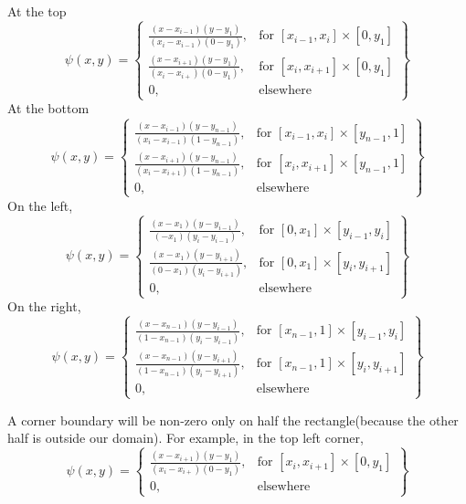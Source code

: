 \documentclass[letterpaper,12pt]{article}
\begin{document}
\begin{enumerate}
 At the top
   \[
    \psi(x, y) = \left\{\begin{array}{lr}
       \frac{(x-x_{i-1})(y-y_1)}{(x_i-x_{i-1})(0-y_1)}, & \text{for } [x_{i-1},x_{i}]\times[0,y_1]\\
    \frac{(x-x_{i+1})(y-y_1)}{(x_i-x_{i+})(0-y_1)}, & \text{for } [x_{i},x_{i+1}]\times[0,y_1]\\
        0, & \text{elsewhere } 
        \end{array}\right\} \]
        At the bottom
           \[
    \psi(x, y) = \left\{\begin{array}{lr}
         \frac{(x-x_{i-1})(y-y_{n-1})}{(x_i-x_{i-1})(1-y_{n-1})}, & \text{for } [x_{i-1},x_{i}]\times[y_{n-1},1]\\
 \frac{(x-x_{i+1})(y-y_{n-1})}{(x_i-x_{i+1})(1-y_{n-1})}, & \text{for } [x_{i},x_{i+1}]\times[y_{n-1},1]\\
        0, & \text{elsewhere } 
        \end{array}\right\} \]
       On the left,
           \[
    \psi(x, y) = \left\{\begin{array}{lr}
         \frac{(x-x_{1})(y-y_{i-1})}{(-x_{1})(y_i-y_{i-1})}, & \text{for } [0,x_{1}]\times [y_{i-1},y_{i}]\\
  \frac{(x-x_{1})(y-y_{i+1})}{(0-x_{1})(y_i-y_{i+1})}, & \text{for } [0,x_{1}]\times [y_{i},y_{i+1}]\\
        0, & \text{elsewhere } 
        \end{array}\right\} \]
         On the right,
           \[
    \psi(x, y) = \left\{\begin{array}{lr}
         \frac{(x-x_{n-1})(y-y_{i-1})}{(1-x_{n-1})(y_i-y_{i-1})}, & \text{for } [x_{n-1},1]\times [y_{i-1},y_{i}]\\
  \frac{(x-x_{n-1})(y-y_{i+1})}{(1-x_{n-1})(y_i-y_{i+1})}, & \text{for } [x_{n-1},1]\times [y_{i},y_{i+1}]\\
        0, & \text{elsewhere } 
        \end{array}\right\} \]      

A corner boundary will be non-zero only on half the rectangle(because the other half is outside our domain). For example, in the top left corner,
   \[
    \psi(x, y) = \left\{\begin{array}{lr}
 
    \frac{(x-x_{i+1})(y-y_1)}{(x_i-x_{i+})(0-y_1)}, & \text{for } [x_{i},x_{i+1}]\times[0,y_1]\\
        0, & \text{elsewhere } 
        \end{array}\right\} \]   
        

\end{enumerate}
\end{document}
